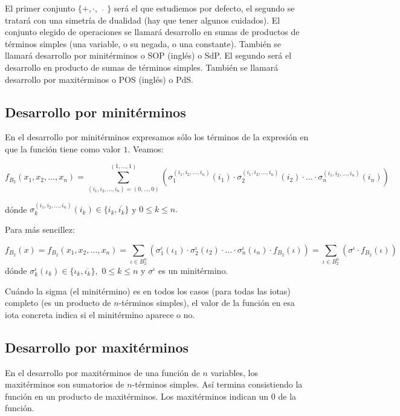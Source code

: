 El primer conjunto $\{+, \cdot, \overline{\quad}\}$ será el que estudiemos por defecto, el segundo se tratará con una simetría de dualidad (hay que tener algunos cuidados). El conjunto elegido de operaciones se llamará desarrollo en sumas de productos de términos simples (una variable, o su negada, o una constante). También se llamará desarrollo por minitérminos o SOP (inglés) o SdP. El segundo será el desarrollo en producto de sumas de términos simples. También se llamará desarrollo por maxitérminos o POS (inglés) o PdS.

\subsection{Desarrollo por minitérminos}
En el desarrollo por minitérminos expresamos sólo los términos de la expresión en que la función tiene como valor $1.$ Veamos:

\[
f_{B_{2}}(x_{1}, x_{2}, \dots, x_{n}) = \sum_{(i_{1}, i_{2}, \dots, i_{n}) = (0, \dots, 0)}^{(1, \dots, 1)} \left( \sigma_{1}^{(i_{1}, i_{2}, \dots, i_{n})}(i_{1}) \cdot \sigma_{2}^{(i_{1}, i_{2}, \dots, i_{n})}(i_{2}) \cdot \dots \cdot \sigma_{n}^{(i_{1}, i_{2}, \dots, i_{n})}(i_{n}) \right)
\]

dónde $\sigma_{k}^{(i_{1}, i_{2}, \dots, i_{n})}(i_{k}) \in \{i_{k}, \overline{i_{k}}\}$ y $0 \leq k \leq n.$

Para más sencillez:

\[
f_{B_{2}}(x) = f_{B_{2}}(x_{1}, x_{2}, \dots, x_{n}) = \sum_{\iota \in B_{2}^{n}} \left( \sigma_{1}^{\iota}(\iota_{1}) \cdot \sigma_{2}^{\iota}(\iota_{2}) \cdot \dots \cdot \sigma_{n}^{\iota}(\iota_{n}) \cdot f_{B_{2}}(\iota) \right) = \sum_{\iota \in B_{2}^{n}} (\sigma^{\iota} \cdot f_{B_{2}}(\iota))
\]
dónde $\sigma_{k}^{\iota}(\iota_{k}) \in \{\iota_{k}, \overline{\iota_{k}}\},$ $0 \leq k \leq n$ y $\sigma^{\iota}$ es un minitérmino.

Cuándo la sigma (el minitérmino) es en todos los casos (para todas las iotas) completo (es un producto de $n$-términos simples), el valor de la función en esa iota concreta indica si el minitérmino aparece o no.

\subsection{Desarrollo por maxitérminos}
En el desarrollo por maxitérminos de una función de $n$ variables, los maxitérminos son sumatorios de $n$-términos simples. Así termina consistiendo la función en un producto de maxitérminos. Los maxitérminos indican un $0$ de la función.

